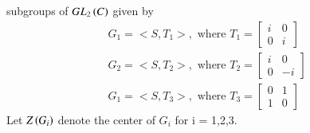 \documentclass[journal]{IEEEtran}
\begin{document}
\begin{enumerate}
    subgroups of $GL_2\left(C\right)$ given by\\
    \begin{align*}
        G_1 = <S,T_1>, \text{ where }T_1 = \begin{bmatrix}i&0\\0&i\end{bmatrix} \\
        G_2 = <S,T_2>, \text{ where }T_2 = \begin{bmatrix}i&0\\0&-i\end{bmatrix}\\
        G_1 = <S,T_3>, \text{ where }T_3 = \begin{bmatrix}0&1\\1&0\end{bmatrix}
    \end{align*}
    Let $Z\left(G_i\right)$ denote  the center of $G_i$ for i = 1,2,3.
    

\end{enumerate}
\end{document}
